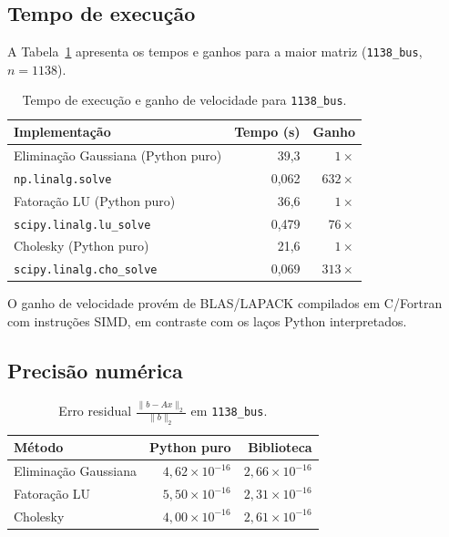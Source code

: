 \documentclass[12pt, a4paper]{article}
\begin{document}
\subsection{Tempo de execução}
 
A Tabela~\ref{tab:biblio_tempo} apresenta os tempos e ganhos para a maior matriz
(\texttt{1138\_bus}, $n = 1138$).
 
\begin{table}[H]
  \centering
  \caption{Tempo de execução e ganho de velocidade para \texttt{1138\_bus}.}
  \label{tab:biblio_tempo}
  \renewcommand{\arraystretch}{1.3}
  \begin{tabular}{lrr}
    \toprule
    \textbf{Implementação} & \textbf{Tempo (s)} & \textbf{Ganho} \\
    \midrule
    Eliminação Gaussiana (Python puro) & 39{,}3  & $1\times$   \\
    \texttt{np.linalg.solve}           & 0{,}062 & $632\times$ \\
    Fatoração LU (Python puro)         & 36{,}6  & $1\times$   \\
    \texttt{scipy.linalg.lu\_solve}    & 0{,}479 & $76\times$  \\
    Cholesky (Python puro)             & 21{,}6  & $1\times$   \\
    \texttt{scipy.linalg.cho\_solve}   & 0{,}069 & $313\times$ \\
    \bottomrule
  \end{tabular}
\end{table}
 
O ganho de velocidade provém de BLAS/LAPACK compilados em C/Fortran com instruções
SIMD, em contraste com os laços Python interpretados.
 
\subsection{Precisão numérica}
 
\begin{table}[H]
  \centering
  \caption{Erro residual $\frac{\|b - Ax\|_2}{\|b\|_2}$ em \texttt{1138\_bus}.}
  \label{tab:biblio_precisao}
  \renewcommand{\arraystretch}{1.3}
  \begin{tabular}{lrr}
    \toprule
    \textbf{Método} & \textbf{Python puro} & \textbf{Biblioteca} \\
    \midrule
    Eliminação Gaussiana & $4{,}62 \times 10^{-16}$ & $2{,}66 \times 10^{-16}$ \\
    Fatoração LU         & $5{,}50 \times 10^{-16}$ & $2{,}31 \times 10^{-16}$ \\
    Cholesky             & $4{,}00 \times 10^{-16}$ & $2{,}61 \times 10^{-16}$ \\
    \bottomrule
  \end{tabular}
\end{table}
 
\end{document}
